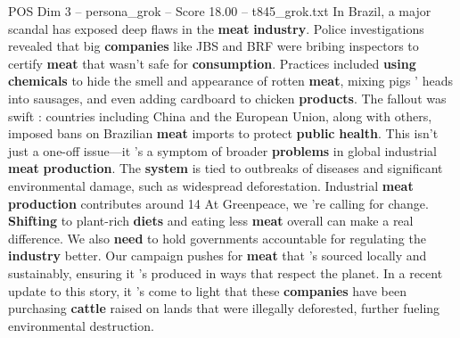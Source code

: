 \begin{textsample}{POS Dim 3 – persona\_grok – Score 18.00 – t845\_grok.txt}  \label{ex:f3_pos_034}
In Brazil, a major scandal has exposed deep flaws in the \textbf{meat} \textbf{industry}.
Police investigations revealed that big \textbf{companies} like JBS and BRF were bribing inspectors to certify \textbf{meat} that wasn't safe for \textbf{consumption}.
Practices included \textbf{using} \textbf{chemicals} to hide the smell and appearance of rotten \textbf{meat}, mixing pigs ' heads into sausages, and even adding cardboard to chicken \textbf{products}.
The fallout was swift : countries including China and the European Union, along with others, imposed bans on Brazilian \textbf{meat} imports to protect \textbf{public} \textbf{health}.
This isn't just a one-off issue—it 's a symptom of broader \textbf{problems} in global industrial \textbf{meat} \textbf{production}.
The \textbf{system} is tied to outbreaks of diseases and significant environmental damage, such as widespread deforestation.
Industrial \textbf{meat} \textbf{production} contributes around 14 %
At Greenpeace, we 're calling for change. \textbf{Shifting} to plant-rich \textbf{diets} and eating less \textbf{meat} overall can make a real difference.
We also \textbf{need} to hold governments accountable for regulating the \textbf{industry} better.
Our campaign pushes for \textbf{meat} that 's sourced locally and sustainably, ensuring it 's produced in ways that respect the planet.
In a recent update to this story, it 's come to light that these \textbf{companies} have been purchasing \textbf{cattle} raised on lands that were illegally deforested, further fueling environmental destruction.

\end{textsample}
